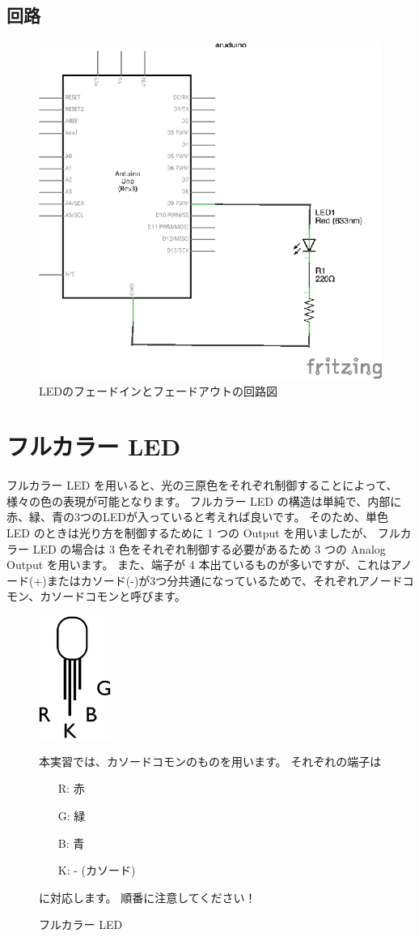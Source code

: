 \documentclass[11pt,a4paper]{jarticle}
\begin{document}
\subsection*{回路}
\begin{figure}[h!]
 \centering
 \includegraphics[width=0.5\columnwidth]{img/LED_circuit.eps}
 \caption{LEDのフェードインとフェードアウトの回路図}
\end{figure}

\section{フルカラー LED}
フルカラー LED を用いると、光の三原色をそれぞれ制御することによって、様々の色の表現が可能となります。
フルカラー LED の構造は単純で、内部に赤、緑、青の3つのLEDが入っていると考えれば良いです。
そのため、単色 LED のときは光り方を制御するために 1 つの Output を用いましたが、
フルカラー LED の場合は 3 色をそれぞれ制御する必要があるため 3 つの Analog Output を用います。
また、端子が 4 本出ているものが多いですが、これはアノード(+)またはカソード(-)が3つ分共通になっているためで、それぞれアノードコモン、カソードコモンと呼びます。

\begin{figure}[h!]
 \begin{minipage}{0.35\columnwidth}
  \centering
  \includegraphics[height=40mm]{img/full_color_led_detail.eps}
  \caption{フルカラー LED}
 \end{minipage}
 \begin{minipage}{0.65\columnwidth}
  本実習では、カソードコモンのものを用います。%
  それぞれの端子は
  \begin{itemize}
   \item[R:] 赤
   \item[G:] 緑
   \item[B:] 青
   \item[K:] - (カソード)
  \end{itemize}
  に対応します。
  順番に注意してください！
 \end{minipage}
\end{figure}
\end{document}
